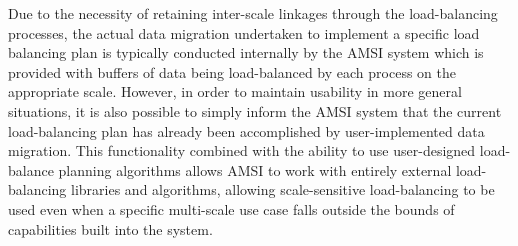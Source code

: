Due to the necessity of retaining inter-scale linkages through the load-balancing processes, the actual data migration undertaken to implement a specific load balancing plan is typically conducted internally by the AMSI system which is provided with buffers of data being load-balanced by each process on the appropriate scale. However, in order to maintain usability in more general situations, it is also possible to simply inform the AMSI system that the current load-balancing plan has already been accomplished by user-implemented data migration. This functionality combined with the ability to use user-designed load-balance planning algorithms allows AMSI to work with entirely external load-balancing libraries and algorithms, allowing scale-sensitive load-balancing to be used even when a specific multi-scale use case falls outside the bounds of capabilities built into the system.
